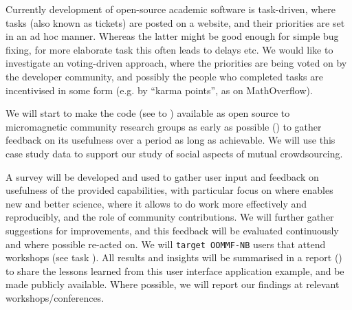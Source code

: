 \begin{workpackage}[id=social-aspects,wphases=0-48,
  title=Social Aspects,
  lead=UO,
  UORM=53,USHRM=8, USORM=5]
\begin{tasklist}
\begin{task}[title=Collective decision making in development,id=decisionmaking]
Currently development of open-source academic software is task-driven, where tasks (also
known as tickets) are posted on a website, and their priorities are set in an ad hoc manner.
Whereas the latter might be good enough for simple bug fixing, for more elaborate task this
often leads to delays etc.
We would like to investigate an voting-driven approach, where the priorities are being
voted on by the developer community, and possibly the people who completed tasks
are incentivised in some form (e.g. by ``karma points'', as on MathOverflow).
\end{task}

\begin{task}[title=OOMMF case study: Evaluation,lead=USO,PM=5]
  We will start to make the \OOMMFNB{} code (see
   to
  ) available as open
  source to micromagnetic community research groups as early as
  possible
  () to
  gather feedback on its usefulness over a period as long as
  achievable. We will use this case study data to support our study of
  social aspects of mutual crowdsourcing.

  A survey will be developed and used to gather user input and feedback on usefulness of
  the provided capabilities, with particular focus on where \OOMMFNB{} enables new and
  better science, where it allows to do work more effectively and reproducibly, and the
  role of community contributions. We will further gather suggestions for improvements,
  and this feedback will be evaluated continuously and where possible re-acted on. We will
  \texttt{target OOMMF-NB} users that attend workshops (see task
  ). All results and insights will be
  summarised in a report () to share the lessons
  learned from this user interface application example, and be made publicly
  available. Where possible, we will report our findings at relevant
  workshops/conferences.
\end{task}



\end{tasklist}



\end{workpackage}
